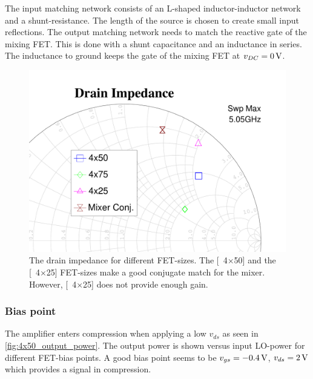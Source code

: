 	The input matching network consists of an L-shaped inductor-inductor network and a shunt-resistance. The length of the source is chosen to create small input reflections. The output matching network needs to match the reactive gate of the mixing FET. This is done with a shunt capacitance and an inductance in series. The inductance to ground keeps the gate of the mixing FET at $v_{DC}=\unit[0]{V}$.
			\begin{figure}[hbt!]
				\centering
				\includegraphics[width=1.0\textwidth]{fig/amplifiers/lo/FET_size_S22_zoom}
				\caption[Drain impedance for different FET's.]{The drain impedance for different FET-sizes. The \unit[4$\times$50]{\mum} and the \unit[4$\times$25]{\mum} FET-sizes make a good conjugate match for the mixer. However, \unit[4$\times$25]{\mum} does not provide enough gain.} \label{fig:FET_size_S22}
			\end{figure}

		\subsubsection{Bias point}
			The amplifier enters compression when applying a low $v_{ds}$ as seen in \autoref{fig:4x50_output_power}. The output power is shown versus input LO-power for different FET-bias points. A good bias point seems to be $v_{gs}=\unit[-0.4]{V}$, $v_{ds}=\unit[2]{V}$ which provides a signal in compression.

